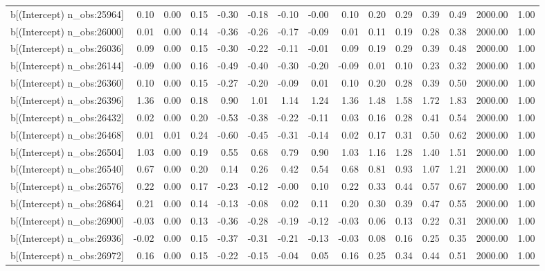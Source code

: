 \begin{table}[ht]
\begin{tabular}{rrrrrrrrrrrrrrr}
  b[(Intercept) n\_obs:25964] & 0.10 & 0.00 & 0.15 & -0.30 & -0.18 & -0.10 & -0.00 & 0.10 & 0.20 & 0.29 & 0.39 & 0.49 & 2000.00 & 1.00 \\ 
  b[(Intercept) n\_obs:26000] & 0.01 & 0.00 & 0.14 & -0.36 & -0.26 & -0.17 & -0.09 & 0.01 & 0.11 & 0.19 & 0.28 & 0.38 & 2000.00 & 1.00 \\ 
  b[(Intercept) n\_obs:26036] & 0.09 & 0.00 & 0.15 & -0.30 & -0.22 & -0.11 & -0.01 & 0.09 & 0.19 & 0.29 & 0.39 & 0.48 & 2000.00 & 1.00 \\ 
  b[(Intercept) n\_obs:26144] & -0.09 & 0.00 & 0.16 & -0.49 & -0.40 & -0.30 & -0.20 & -0.09 & 0.01 & 0.10 & 0.23 & 0.32 & 2000.00 & 1.00 \\ 
  b[(Intercept) n\_obs:26360] & 0.10 & 0.00 & 0.15 & -0.27 & -0.20 & -0.09 & 0.01 & 0.10 & 0.20 & 0.28 & 0.39 & 0.50 & 2000.00 & 1.00 \\ 
  b[(Intercept) n\_obs:26396] & 1.36 & 0.00 & 0.18 & 0.90 & 1.01 & 1.14 & 1.24 & 1.36 & 1.48 & 1.58 & 1.72 & 1.83 & 2000.00 & 1.00 \\ 
  b[(Intercept) n\_obs:26432] & 0.02 & 0.00 & 0.20 & -0.53 & -0.38 & -0.22 & -0.11 & 0.03 & 0.16 & 0.28 & 0.41 & 0.54 & 2000.00 & 1.00 \\ 
  b[(Intercept) n\_obs:26468] & 0.01 & 0.01 & 0.24 & -0.60 & -0.45 & -0.31 & -0.14 & 0.02 & 0.17 & 0.31 & 0.50 & 0.62 & 2000.00 & 1.00 \\ 
  b[(Intercept) n\_obs:26504] & 1.03 & 0.00 & 0.19 & 0.55 & 0.68 & 0.79 & 0.90 & 1.03 & 1.16 & 1.28 & 1.40 & 1.51 & 2000.00 & 1.00 \\ 
  b[(Intercept) n\_obs:26540] & 0.67 & 0.00 & 0.20 & 0.14 & 0.26 & 0.42 & 0.54 & 0.68 & 0.81 & 0.93 & 1.07 & 1.21 & 2000.00 & 1.00 \\ 
  b[(Intercept) n\_obs:26576] & 0.22 & 0.00 & 0.17 & -0.23 & -0.12 & -0.00 & 0.10 & 0.22 & 0.33 & 0.44 & 0.57 & 0.67 & 2000.00 & 1.00 \\ 
  b[(Intercept) n\_obs:26864] & 0.21 & 0.00 & 0.14 & -0.13 & -0.08 & 0.02 & 0.11 & 0.20 & 0.30 & 0.39 & 0.47 & 0.55 & 2000.00 & 1.00 \\ 
  b[(Intercept) n\_obs:26900] & -0.03 & 0.00 & 0.13 & -0.36 & -0.28 & -0.19 & -0.12 & -0.03 & 0.06 & 0.13 & 0.22 & 0.31 & 2000.00 & 1.00 \\ 
  b[(Intercept) n\_obs:26936] & -0.02 & 0.00 & 0.15 & -0.37 & -0.31 & -0.21 & -0.13 & -0.03 & 0.08 & 0.16 & 0.25 & 0.35 & 2000.00 & 1.00 \\ 
  b[(Intercept) n\_obs:26972] & 0.16 & 0.00 & 0.15 & -0.22 & -0.15 & -0.04 & 0.05 & 0.16 & 0.25 & 0.34 & 0.44 & 0.51 & 2000.00 & 1.00 \\ 

\end{tabular}
\end{table}
